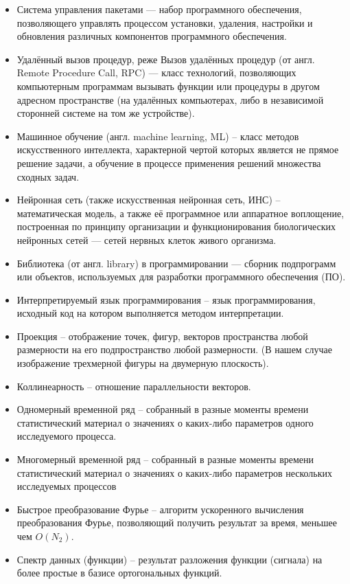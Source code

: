 \begin{itemize}
    \item Система управления пакетами — набор программного обеспечения, позволяющего управлять процессом установки, удаления, настройки и обновления различных компонентов программного обеспечения.
    \item Удалённый вызов процедур, реже Вызов удалённых процедур (от англ. Remote Procedure Call, RPC) — класс технологий, позволяющих компьютерным программам вызывать функции или процедуры в другом адресном пространстве (на удалённых компьютерах, либо в независимой сторонней системе на том же устройстве).
    \item Машинное обучение (англ. machine learning, ML) -- класс методов искусственного интеллекта, характерной чертой которых является не прямое решение задачи, а обучение в процессе применения решений множества сходных задач.
    \item Нейронная сеть (также искусственная нейронная сеть, ИНС) -- математическая модель, а также её программное или аппаратное воплощение, построенная по принципу организации и функционирования биологических нейронных сетей — сетей нервных клеток живого организма.
    \item Библиотека (от англ. library) в программировании — сборник подпрограмм или объектов, используемых для разработки программного обеспечения (ПО).
    \item Интерпретируемый язык программирования -- язык программирования, исходный код на котором выполняется методом интерпретации.
    \item Проекция -- отображение точек, фигур, векторов пространства любой размерности на его подпространство любой размерности. (В нашем случае изображение трехмерной фигуры на двумерную плоскость).
    \item Коллинеарность -- отношение параллельности векторов.
    \item Одномерный временной ряд -- собранный в разные моменты времени статистический материал о значениях о каких-либо параметров одного исследуемого процесса.
    \item Многомерный временной ряд -- собранный в разные моменты времени статистический материал о значениях о каких-либо параметров нескольких исследуемых процессов
    \item Быстрое преобразование Фурье -- алгоритм ускоренного вычисления преобразования Фурье, позволяющий получить результат за время, меньшее чем $O(N_2)$.
    \item Спектр данных (функции) -- результат разложения функции (сигнала) на более простые в базисе ортогональных функций.

\end{itemize}